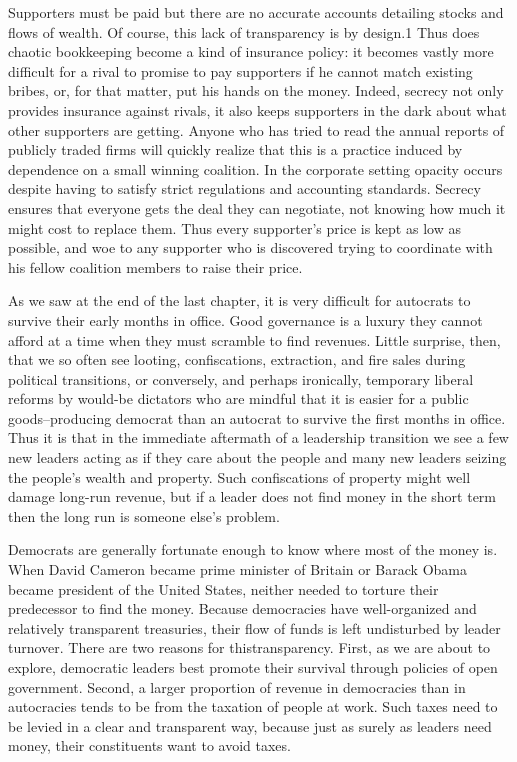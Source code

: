 \documentclass[10pt]{article}
\begin{document}
{\large Supporters must be paid but there are no accurate accounts detailing
stocks and flows of wealth. Of course, this lack of transparency is by design.1
Thus does chaotic bookkeeping become a kind of insurance policy: it becomes
vastly more difficult for a rival to promise to pay supporters if he cannot match
existing bribes, or, for that matter, put his hands on the money. Indeed, secrecy
not only provides insurance against rivals, it also keeps supporters in the dark
about what other supporters are getting. Anyone who has tried to read the annual
reports of publicly traded firms will quickly realize that this is a practice
induced by dependence on a small winning coalition. In the corporate setting
opacity occurs despite having to satisfy strict regulations and accounting
standards. Secrecy ensures that everyone gets the deal they can negotiate, not
knowing how much it might cost to replace them. Thus every supporter's price is
kept as low as possible, and woe to any supporter who is discovered trying to
coordinate with his fellow coalition members to raise their price.}

{\large As we saw at the end of the last chapter, it is very difficult for
autocrats to survive their early months in office. Good governance is a luxury
they cannot afford at a time when they must scramble to find revenues. Little
surprise, then, that we so often see looting, confiscations, extraction, and fire
sales during political transitions, or conversely, and perhaps ironically,
temporary liberal reforms by would-be dictators who are mindful that it is easier
for a public goods--producing democrat than an autocrat to survive the first
months in office. Thus it is that in the immediate aftermath of a leadership
transition we see a few new leaders acting as if they care about the people and
many new leaders seizing the people's wealth and property. Such confiscations of
property might well damage long-run revenue, but if a leader does not find money
in the short term then the long run is someone else's problem.}

{\large Democrats are generally fortunate enough to know where most of the money
is. When David Cameron became prime minister of Britain or Barack Obama became
president of the United States, neither needed to torture their predecessor to
find the money. Because democracies have well-organized and relatively
transparent treasuries, their flow of funds is left undisturbed by leader
turnover. There are two reasons for thistransparency. First, as we are about to
explore, democratic leaders best promote their survival through policies of open
government. Second, a larger proportion of revenue in democracies than in
autocracies tends to be from the taxation of people at work. Such taxes need to
be levied in a clear and transparent way, because just as surely as leaders need
money, their constituents want to avoid taxes.}
\end{document}
